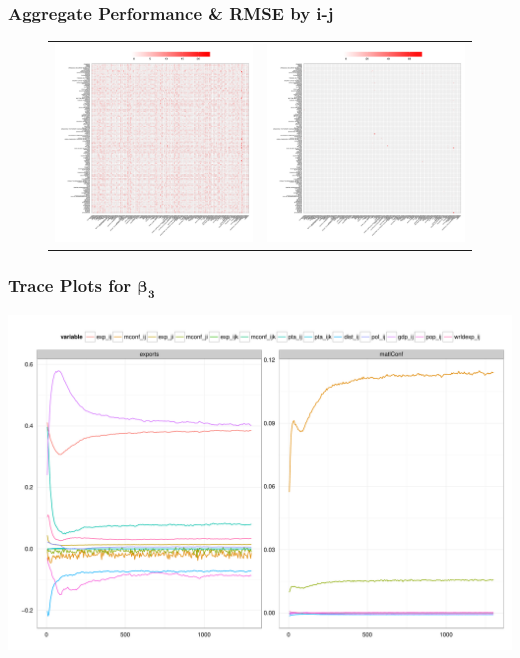 \documentclass[10pt, compress]{beamer}
\begin{document}
\frame
{
\frametitle{Aggregate Performance \& RMSE by i-j}
  
  \vspace*{-.3in}
  \begin{figure}[ht]
  \centering
    \begin{tabular}{cc}
      \includegraphics[width=.45\textwidth]{expiperf.pdf} & 
      \includegraphics[width=.45\textwidth]{mconfiperf.pdf}
    \end{tabular}
  \end{figure}
}

\frame
{
\frametitle{Trace Plots for $\boldsymbol{\beta_{3}}$}
  \centering
  \includegraphics[width=1\textwidth]{trace.pdf}
}
\end{document}
